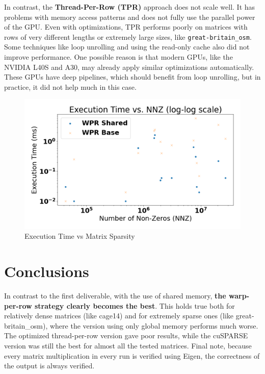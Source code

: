 \documentclass[conference]{IEEEtran}
\begin{document}
In contrast, the \textbf{Thread-Per-Row (TPR)} approach does not scale well. It has problems with memory access patterns and does not fully use the parallel power of the GPU. Even with optimizations, TPR performs poorly on matrices with rows of very different lengths or extremely large sizes, like \texttt{great-britain\_osm}. Some techniques like loop unrolling and using the read-only cache also did not improve performance. One possible reason is that modern GPUs, like the NVIDIA L40S and A30, may already apply similar optimizations automatically. These GPUs have deep pipelines, which should benefit from loop unrolling, but in practice, it did not help much in this case.



\begin{figure}[ht]
    \centering
    \includegraphics[width=0.95\linewidth]{exectimeVsSparsity.png}
    \caption{Execution Time vs Matrix Sparsity}
    \label{fig:spvmexample}
\end{figure}



\section{Conclusions}

In contrast to the first deliverable, with the use of shared memory, \textbf{the warp-per-row strategy clearly becomes the best}. This holds true both for relatively dense matrices (like cage14) and for extremely sparse ones (like great-britain\_osm), where the version using only global memory performs much worse. The optimized thread-per-row version gave poor results, while the cuSPARSE version was still the best for almost all the tested matrices. Final note, because every matrix multiplication in every run is verified using Eigen, the correctness of the output is always verified.



\end{document}
